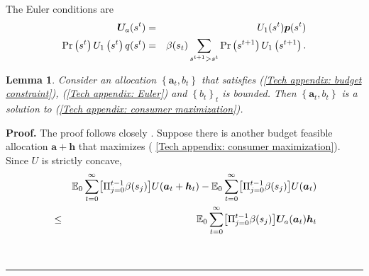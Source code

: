 \documentclass[thmsb,11pt]{article}
\newtheorem{lemma}{Lemma}
\newenvironment{proof}[1][Proof]{\noindent \textbf{#1.} }{\  \rule{0.5em}{0.5em}}
\begin{document}
\begin{appendix}
The Euler conditions are%
\begin{eqnarray}
\bm{U}_{a}(s^{t}) &=&U_{1}(s^{t})\bm{p}(s^{t})
\label{Tech appendix: Euler} \\
\Pr \left( s^{t}\right) U_{1}\left( s^{t}\right) q(s^{t}) &=&\beta(s_t)
\sum_{s^{t+1}>s^{t}}\Pr \left( s^{t+1}\right) U_{1}\left( s^{t+1}\right) .
\notag
\end{eqnarray}

\begin{lemma}
\smallskip Consider an allocation $\left \{ \bm{a}_{t},b_{t}\right \} $
that satisfies (\ref{Tech appendix: budget constraint}), (\ref{Tech
appendix: Euler}) and $\left \{ b_{t}\right \} _{t}$ is bounded. Then $%
\left
\{ \bm{a}_{t},b_{t}\right \} $ is a solution to (\ref{Tech
appendix: consumer maximization}).
\end{lemma}

\begin{proof}
The proof follows closely \cite{Constantinides1996}. Suppose there is
another budget feasible allocation $\bm{a}+\bm{h}$ that maximizes (%
\ref{Tech appendix: consumer maximization}). Since $U$ is strictly concave,
\begin{eqnarray}
&&\mathbb{E}_{0}\sum_{t=0}^{\infty }\bigl[\Pi_{j=0}^{t-1} \beta(s_j)\bigr]U(\bm{a}_{t}+\bm{h}%
_{t})-\mathbb{E}_{0}\sum_{t=0}^{\infty }\bigl[\Pi_{j=0}^{t-1} \beta(s_j)\bigr]U(\bm{a}_{t})
\label{Tech appendix: gain from h} \\
&\leq &\mathbb{E}_{0}\sum_{t=0}^{\infty }\bigl[\Pi_{j=0}^{t-1} \beta(s_j)\bigr]\bm{U}_{a}(\bm{a}%
_{t})\bm{h}_{t}  \notag
\end{eqnarray}


\end{proof}
\end{appendix}
\end{document}
